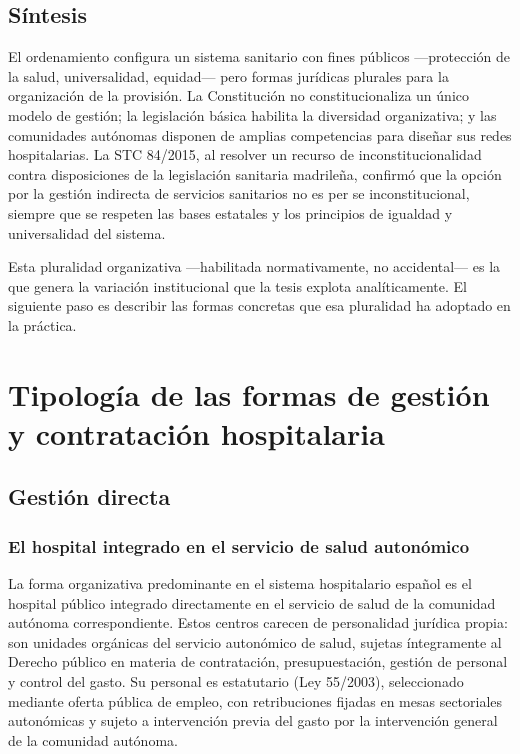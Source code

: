 \subsection{Síntesis}

El ordenamiento configura un sistema sanitario con fines públicos ---protección de la salud, universalidad, equidad--- pero formas jurídicas plurales para la organización de la provisión. La Constitución no constitucionaliza un único modelo de gestión; la legislación básica habilita la diversidad organizativa; y las comunidades autónomas disponen de amplias competencias para diseñar sus redes hospitalarias. La STC 84/2015, al resolver un recurso de inconstitucionalidad contra disposiciones de la legislación sanitaria madrileña, confirmó que la opción por la gestión indirecta de servicios sanitarios no es per se inconstitucional, siempre que se respeten las bases estatales y los principios de igualdad y universalidad del sistema.

Esta pluralidad organizativa ---habilitada normativamente, no accidental--- es la que genera la variación institucional que la tesis explota analíticamente. El siguiente paso es describir las formas concretas que esa pluralidad ha adoptado en la práctica.



\section{Tipología de las formas de gestión y contratación hospitalaria}
\label{sec:tipologia}

\subsection{Gestión directa}
\label{sec:gestion_directa}

\subsubsection{El hospital integrado en el servicio de salud autonómico}

La forma organizativa predominante en el sistema hospitalario español es el hospital público integrado directamente en el servicio de salud de la comunidad autónoma correspondiente. Estos centros carecen de personalidad jurídica propia: son unidades orgánicas del servicio autonómico de salud, sujetas íntegramente al Derecho público en materia de contratación, presupuestación, gestión de personal y control del gasto. Su personal es estatutario (Ley 55/2003), seleccionado mediante oferta pública de empleo, con retribuciones fijadas en mesas sectoriales autonómicas y sujeto a intervención previa del gasto por la intervención general de la comunidad autónoma.

